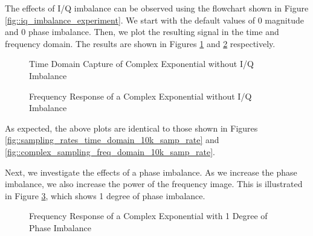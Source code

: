 \documentclass{article}
\begin{document}
The effects of I/Q imbalance can be observed using the flowchart shown in Figure \ref{fig::iq_imbalance_experiment}. We start with the default values of 0 magnitude and 0 phase imbalance. Then, we plot the resulting signal in the time and frequency domain. The results are shown in Figures \ref{fig::iq_imbalance_0_mag_0_phase_time} and \ref{fig::iq_imbalance_0_mag_0_phase_freq} respectively. 

\begin{figure}[H]
	\centerline{}
	\caption{Time Domain Capture of Complex Exponential without I/Q Imbalance}
	\label{fig::iq_imbalance_0_mag_0_phase_time}
\end{figure}

\begin{figure}[H]
	\centerline{}
	\caption{Frequency Response of a Complex Exponential without I/Q Imbalance}
	\label{fig::iq_imbalance_0_mag_0_phase_freq}
\end{figure}

As expected, the above plots are identical to those shown in Figures \ref{fig::sampling_rates_time_domain_10k_samp_rate} and  \ref{fig::complex_sampling_freq_domain_10k_samp_rate}.

Next, we investigate the effects of a phase imbalance. As we increase the phase imbalance, we also increase the power of the frequency image. This is illustrated in Figure \ref{fig::iq_imbalance_0_mag_1_phase_freq}, which shows 1 degree of phase imbalance.

\begin{figure}[H]
	\centerline{}
	\caption{Frequency Response of a Complex Exponential with 1 Degree of Phase Imbalance}
	\label{fig::iq_imbalance_0_mag_1_phase_freq}
\end{figure}
\end{document}
